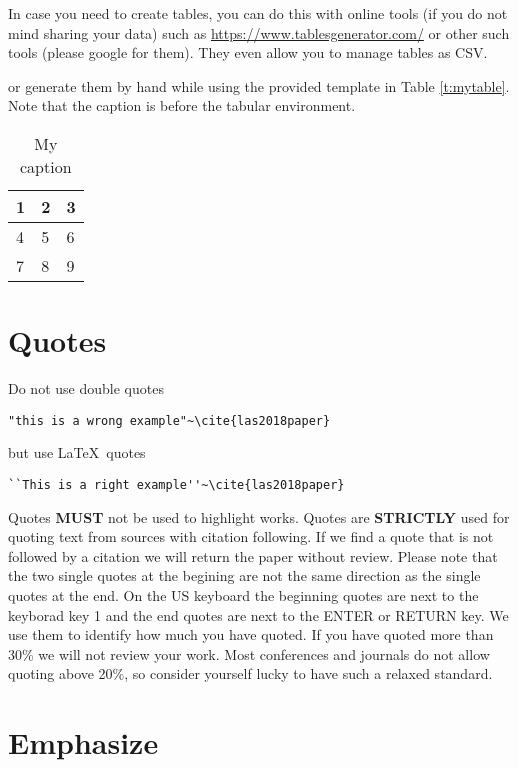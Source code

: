 In case you need to create tables, you can do this with online tools
(if you do not mind sharing your data) such as
\url{https://www.tablesgenerator.com/} or other such tools (please
google for them). They even allow you to manage tables as CSV.

or generate them by hand while using the provided template in Table
\ref{t:mytable}. Note that
the caption is before the tabular environment.

\begin{table}[htb]
\centering
\caption{My caption}
\label{t:mytabble}
\begin{tabular}{lll}
1 & 2 & 3 \\
\toprule
4 & 5 & 6 \\
7 & 8 & 9
\end{tabular}
\end{table}

\section{Quotes}

Do not use double quotes 

\begin{verbatim}
"this is a wrong example"~\cite{las2018paper} 
\end{verbatim}

but use \LaTeX\ quotes

\begin{verbatim}
``This is a right example''~\cite{las2018paper}
\end{verbatim}


Quotes {\bf MUST} not be used to highlight works. Quotes are {\bf
  STRICTLY} used for quoting text from sources with citation
following. If we find a quote that is not followed by a citation we
will return the paper without review. Please note that the two single
quotes at the begining are not the same direction as the single quotes
at the end. On the US keyboard the beginning quotes are next to the
keyborad key 1 and the end quotes are next to the ENTER or RETURN
key. We use them to identify how much you have quoted. If you have
quoted more than 30\% we will not review your work. Most conferences
and journals do not allow quoting above 20\%, so consider yourself
lucky to have such a relaxed standard. 

\section{Emphasize}

